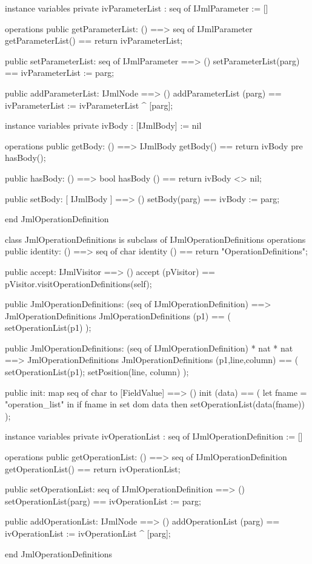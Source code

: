 \begin{vdm_al}
instance variables
  private ivParameterList : seq of IJmlParameter := []

operations
  public getParameterList: () ==> seq of IJmlParameter
  getParameterList() == return ivParameterList;

  public setParameterList: seq of IJmlParameter ==> ()
  setParameterList(parg) == ivParameterList := parg;

  public addParameterList: IJmlNode ==> ()
  addParameterList (parg) == ivParameterList := ivParameterList ^ [parg];

instance variables
  private ivBody : [IJmlBody] := nil

operations
  public getBody: () ==> IJmlBody
  getBody() == return ivBody
    pre hasBody();

  public hasBody: () ==> bool
  hasBody () == return ivBody <> nil;

  public setBody: [ IJmlBody ] ==> ()
  setBody(parg) == ivBody := parg;

end JmlOperationDefinition
\end{vdm_al}

\begin{vdm_al}
class JmlOperationDefinitions is subclass of IJmlOperationDefinitions
operations
  public identity: () ==> seq of char
  identity () == return "OperationDefinitions";

  public accept: IJmlVisitor ==> ()
  accept (pVisitor) == pVisitor.visitOperationDefinitions(self);

  public JmlOperationDefinitions:
    (seq of IJmlOperationDefinition) ==> JmlOperationDefinitions
  JmlOperationDefinitions (p1) == 
    ( setOperationList(p1) );

  public JmlOperationDefinitions:
    (seq of IJmlOperationDefinition) *
    nat *
    nat ==> JmlOperationDefinitions
  JmlOperationDefinitions (p1,line,column) == 
    ( setOperationList(p1);
      setPosition(line, column) );

  public init: map seq of char to [FieldValue] ==> ()
  init (data) ==
    ( let fname = "operation_list" in
        if fname in set dom data
        then setOperationList(data(fname)) );

instance variables
  private ivOperationList : seq of IJmlOperationDefinition := []

operations
  public getOperationList: () ==> seq of IJmlOperationDefinition
  getOperationList() == return ivOperationList;

  public setOperationList: seq of IJmlOperationDefinition ==> ()
  setOperationList(parg) == ivOperationList := parg;

  public addOperationList: IJmlNode ==> ()
  addOperationList (parg) == ivOperationList := ivOperationList ^ [parg];

end JmlOperationDefinitions
\end{vdm_al}

